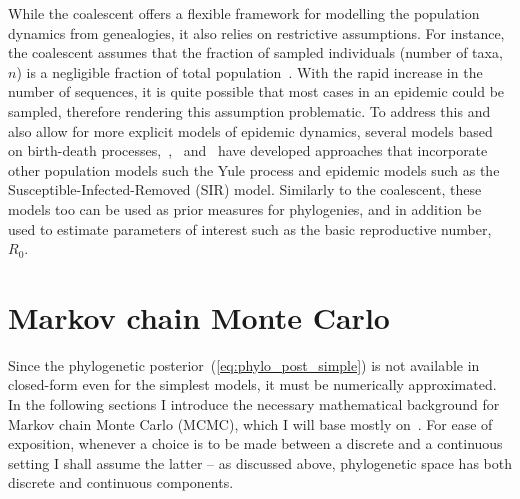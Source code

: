 While the coalescent offers a flexible framework for modelling the population dynamics from genealogies, it also relies on restrictive assumptions.
For instance, the coalescent assumes that the fraction of sampled individuals (number of taxa, $n$) is a negligible fraction of total population~\citep{Fu2006,Volz2009}.
With the rapid increase in the number of sequences, it is quite possible that most cases in an epidemic could be sampled, therefore rendering this assumption problematic.
To address this and also allow for more explicit models of epidemic dynamics, several models based on birth-death processes,~\cite{Volz2009},~\cite{Rasmussen2011} and~\cite{Stadler2011} have developed approaches that incorporate other population models such the Yule process and epidemic models such as the Susceptible-Infected-Removed (SIR) model.
Similarly to the coalescent, these models too can be used as prior measures for phylogenies, and in addition be used to estimate parameters of interest such as the basic reproductive number, $R_0$.

\section{Markov chain Monte Carlo}
\label{sec:mcmc}

Since the phylogenetic posterior~(\ref{eq:phylo_post_simple}) is not available in closed-form even for the simplest models, it must be numerically approximated.
In the following sections I introduce the necessary mathematical background for Markov chain Monte Carlo (MCMC), which I will base mostly on~\cite{Geyer2011}.
For ease of exposition, whenever a choice is to be made between a discrete and a continuous setting I shall assume the latter -- as discussed above, phylogenetic space has both discrete and continuous components.

